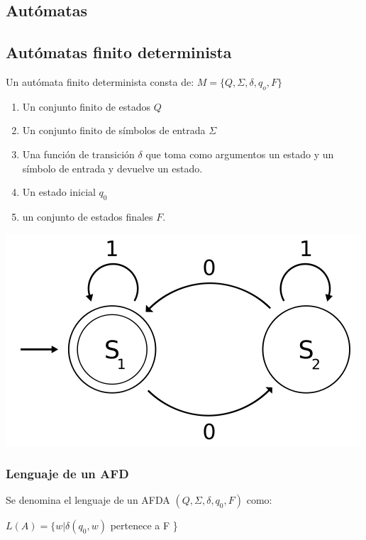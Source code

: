 \documentclass[a4paper,9pt]{extarticle}
\newenvironment{Figure}
  {\par\medskip\noindent\minipage{\linewidth}}
  {\endminipage\par\medskip}
\begin{document}
\begin{multicols*}{2}
\section{Autómatas}

\subsection{Autómatas finito determinista}
Un autómata finito determinista consta de: $M = \{Q, \Sigma, \delta, q_o, F\}$

\begin{enumerate}
\item Un conjunto finito de estados $Q$
\item Un conjunto finito de símbolos de entrada $\Sigma$
\item Una función de transición $\delta$ que toma como argumentos un estado y un símbolo de entrada y devuelve un estado.
\item Un estado inicial $q_0$
\item un conjunto de estados finales $F$.
\end{enumerate}

\begin{Figure}
 \centering
 \includegraphics[scale=0.3]{AFD}
\end{Figure}



\subsubsection{Lenguaje de un AFD}
Se denomina el lenguaje de un AFDA $(Q, \Sigma, \delta, q_0, F)$ como:

$L(A) = \{w| \delta(q_0, w)$ pertenece a F \}


\end{multicols*}
\end{document}
